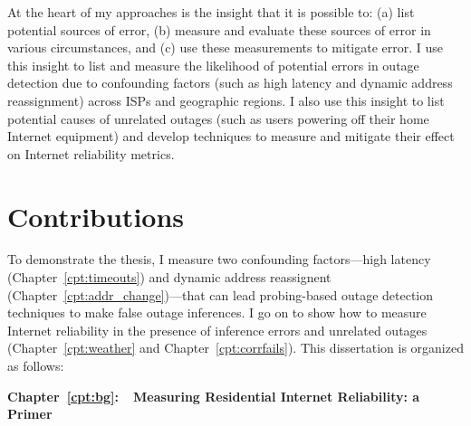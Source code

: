 
At the heart of my approaches is the insight that it is possible to: (a) list
potential sources of error, (b) measure and evaluate these sources of
error in various circumstances, and (c) use these
measurements to mitigate error. I use this insight to list and
measure the likelihood of potential errors in outage detection due
to confounding factors (such as high latency and dynamic address reassignment) across ISPs and
geographic regions. I also use this insight to list potential causes
of unrelated outages (such as users powering off their
home Internet equipment) and develop techniques to 
measure and mitigate their effect on Internet reliability metrics. %


\section{Contributions}

To demonstrate the thesis, I measure two confounding factors---high
latency (Chapter~\ref{cpt:timeouts}) and dynamic address reassignent
(Chapter~\ref{cpt:addr_change})---that can lead probing-based outage
detection techniques to make false outage inferences. I go on to show how
to measure Internet reliability in the presence of inference errors
and unrelated outages (Chapter~\ref{cpt:weather} and
Chapter~\ref{cpt:corrfails}). This dissertation is organized as follows:



\textbf{Chapter~\ref{cpt:bg}:~~Measuring Residential Internet
  Reliability: a Primer}

